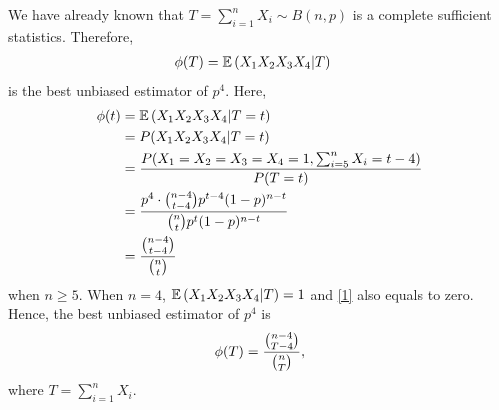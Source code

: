 \documentclass{article}
\begin{document}
\begin{CJK}{UTF8}{gbsn}
\begin{itemize}
              \noindent We have already known that
              $T=\sum_{i=1}^n X_i \sim B(n, p)$ is a complete sufficient statistics. Therefore,
              \begin{align}
                  \phi(T) & = {\mathbb E} \left (X_1X_2X_3X_4 | T \right )\notag
              \end{align}
              is the best unbiased estimator of $p^4$.
              Here,
              \begin{align}
                  \phi(t) & = {\mathbb E} \left (X_1X_2X_3X_4 | T=t \right ) \notag                                            \\
                          & = P (X_1X_2X_3X_4 |T=t) \notag                                                             \\
                          & = \frac{P(X_1=X_2=X_3=X_4 =1, \sum_{i=5}^n X_i = t - 4)}{P(T=t)}\notag                     \\
                          & = \frac{p^4 \cdot \binom{n-4}{t-4} p^{t-4} (1-p)^{n-t}}{\binom{n}{t}p^t(1-p)^{n-t}} \notag \\
                          & = \frac{\binom{n-4}{t-4}}{\binom{n}{t}}\label{1}
              \end{align}
              when $n \geq 5$. When $n=4$, ${\mathbb E} \left (X_1X_2X_3X_4 | T \right ) = 1$ and \eqref{1} also equals to zero.
              Hence, the best unbiased estimator of $p^4$ is
              \begin{align}
                  \phi(T) = \frac{\binom{n-4}{T-4}}{\binom{n}{T}},\notag
              \end{align}
              where $T=\sum_{i=1}^n X_i$.
    \end{itemize}





\end{CJK}
\end{document}

